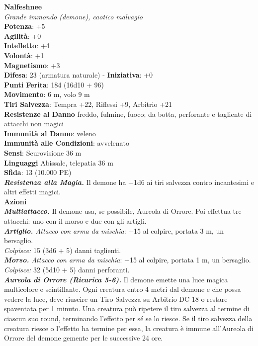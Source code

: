 \begin{multicols}{2}
\medskip\textbf{Nalfeshnee}\\
\emph{Grande immondo (demone), caotico malvagio}\\
\textbf{Potenza}: +5\\
\textbf{Agilità}: +0\\
\textbf{Intelletto}: +4\\
\textbf{Volontà}: +1\\
\textbf{Magnetismo}: +3\\
\textbf{Difesa}: 23 (armatura naturale) - \textbf{Iniziativa}: +0\\
\textbf{Punti Ferita}: 184 (16d10 + 96)\\
\textbf{Movimento}: 6 m, volo 9 m\\
\textbf{Tiri Salvezza}: Tempra +22, Riflessi +9, Arbitrio +21\\
\textbf{Resistenze al Danno} freddo, fulmine, fuoco; da botta, perforante e tagliente di attacchi non magici\\
\textbf{Immunità al Danno}: veleno\\
\textbf{Immunità alle Condizioni}: avvelenato\\
\textbf{Sensi}: Scurovisione 36 m\\
\textbf{Linguaggi} Abissale, telepatia 36 m \\
\textbf{Sfida}: 13 (10.000 PE)\smallskip\\
\emph{\textbf{Resistenza alla Magia.}} Il demone ha +1d6 ai tiri salvezza contro incantesimi e altri effetti magici.\\
\smallskip\textbf{Azioni}\\
\emph{\textbf{Multiattacco.}} Il demone usa, se possibile, Aureola di Orrore. Poi effettua tre attacchi: uno con il morso e due con gli artigli.\\
\emph{\textbf{Artiglio.} Attacco con arma da mischia}: +15 al colpire, portata 3 m, un bersaglio.\\
\emph{Colpisce:} 15 (3d6 + 5) danni taglienti.\\
\emph{\textbf{Morso.} Attacco con arma da mischia}: +15 al colpire, portata 1 m, un bersaglio.\\
\emph{Colpisce:} 32 (5d10 + 5) danni perforanti.\\
\emph{\textbf{Aureola di Orrore (Ricarica 5-6).}} Il demone emette una luce magica multicolore e scintillante. Ogni creatura entro 4 metri dal demone e che possa vedere la luce, deve riuscire un Tiro Salvezza su Arbitrio DC  18 o restare spaventata per 1 minuto. Una creatura può ripetere il tiro salvezza al termine di ciascun suo round, terminando l'effetto per sé se lo riesce. Se il tiro salvezza della creatura riesce o l'effetto ha termine per essa, la creatura è immune all'Aureola di Orrore del demone gemente per le successive 24 ore.\\

\end{multicols}
